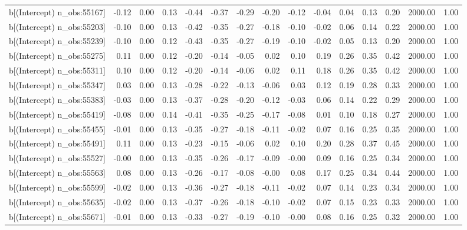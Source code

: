 \begin{table}[ht]
\begin{tabular}{rrrrrrrrrrrrrrr}
  b[(Intercept) n\_obs:55167] & -0.12 & 0.00 & 0.13 & -0.44 & -0.37 & -0.29 & -0.20 & -0.12 & -0.04 & 0.04 & 0.13 & 0.20 & 2000.00 & 1.00 \\ 
  b[(Intercept) n\_obs:55203] & -0.10 & 0.00 & 0.13 & -0.42 & -0.35 & -0.27 & -0.18 & -0.10 & -0.02 & 0.06 & 0.14 & 0.22 & 2000.00 & 1.00 \\ 
  b[(Intercept) n\_obs:55239] & -0.10 & 0.00 & 0.12 & -0.43 & -0.35 & -0.27 & -0.19 & -0.10 & -0.02 & 0.05 & 0.13 & 0.20 & 2000.00 & 1.00 \\ 
  b[(Intercept) n\_obs:55275] & 0.11 & 0.00 & 0.12 & -0.20 & -0.14 & -0.05 & 0.02 & 0.10 & 0.19 & 0.26 & 0.35 & 0.42 & 2000.00 & 1.00 \\ 
  b[(Intercept) n\_obs:55311] & 0.10 & 0.00 & 0.12 & -0.20 & -0.14 & -0.06 & 0.02 & 0.11 & 0.18 & 0.26 & 0.35 & 0.42 & 2000.00 & 1.00 \\ 
  b[(Intercept) n\_obs:55347] & 0.03 & 0.00 & 0.13 & -0.28 & -0.22 & -0.13 & -0.06 & 0.03 & 0.12 & 0.19 & 0.28 & 0.33 & 2000.00 & 1.00 \\ 
  b[(Intercept) n\_obs:55383] & -0.03 & 0.00 & 0.13 & -0.37 & -0.28 & -0.20 & -0.12 & -0.03 & 0.06 & 0.14 & 0.22 & 0.29 & 2000.00 & 1.00 \\ 
  b[(Intercept) n\_obs:55419] & -0.08 & 0.00 & 0.14 & -0.41 & -0.35 & -0.25 & -0.17 & -0.08 & 0.01 & 0.10 & 0.18 & 0.27 & 2000.00 & 1.00 \\ 
  b[(Intercept) n\_obs:55455] & -0.01 & 0.00 & 0.13 & -0.35 & -0.27 & -0.18 & -0.11 & -0.02 & 0.07 & 0.16 & 0.25 & 0.35 & 2000.00 & 1.00 \\ 
  b[(Intercept) n\_obs:55491] & 0.11 & 0.00 & 0.13 & -0.23 & -0.15 & -0.06 & 0.02 & 0.10 & 0.20 & 0.28 & 0.37 & 0.45 & 2000.00 & 1.00 \\ 
  b[(Intercept) n\_obs:55527] & -0.00 & 0.00 & 0.13 & -0.35 & -0.26 & -0.17 & -0.09 & -0.00 & 0.09 & 0.16 & 0.25 & 0.34 & 2000.00 & 1.00 \\ 
  b[(Intercept) n\_obs:55563] & 0.08 & 0.00 & 0.13 & -0.26 & -0.17 & -0.08 & -0.00 & 0.08 & 0.17 & 0.25 & 0.34 & 0.44 & 2000.00 & 1.00 \\ 
  b[(Intercept) n\_obs:55599] & -0.02 & 0.00 & 0.13 & -0.36 & -0.27 & -0.18 & -0.11 & -0.02 & 0.07 & 0.14 & 0.23 & 0.34 & 2000.00 & 1.00 \\ 
  b[(Intercept) n\_obs:55635] & -0.02 & 0.00 & 0.13 & -0.37 & -0.26 & -0.18 & -0.10 & -0.02 & 0.07 & 0.15 & 0.23 & 0.33 & 2000.00 & 1.00 \\ 
  b[(Intercept) n\_obs:55671] & -0.01 & 0.00 & 0.13 & -0.33 & -0.27 & -0.19 & -0.10 & -0.00 & 0.08 & 0.16 & 0.25 & 0.32 & 2000.00 & 1.00 \\ 

\end{tabular}
\end{table}
